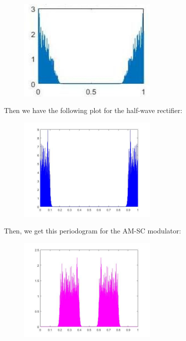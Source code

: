 \documentclass[a4paper,11pt]{article}
\begin{document}
\begin{figure}[!hp]
    \begin{center}
    \includegraphics[width=0.6\textwidth]{images/lab3_figure10.jpg}
    \end{center}
\end{figure}

Then we have the following plot for the half-wave rectifier:

\begin{figure}[!hp]
    \begin{center}
    \includegraphics[width=0.6\textwidth]{images/lab3_figure10_1.jpg}
    \end{center}
\end{figure}

\newpage

Then, we get this periodogram for the AM-SC modulator:

\begin{figure}[!hp]
    \begin{center}
    \includegraphics[width=0.6\textwidth]{images/lab3_figure10_4.jpg}
    \end{center}
\end{figure}
\end{document}
